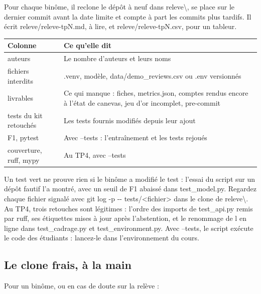 \documentclass[11pt,a4paper]{article}
\newcommand{\co}[1]{{\ttfamily\hyphenchar\font=45\relax #1}}
\newcommand{\bs}{\textbackslash\allowbreak{}}
\begin{document}
Pour chaque binôme, il reclone le dépôt à neuf dans \co{releve\bs}, se place sur le dernier commit avant la
date limite et compte à part les commits plus tardifs. Il écrit \co{releve/releve-tpN.md}, à lire, et
\co{releve/releve-tpN.csv}, pour un tableur.

\begin{center}
\begin{tabularx}{\textwidth}{@{}l X@{}}
\toprule
\textbf{Colonne} & \textbf{Ce qu'elle dit} \\
\midrule
\co{auteurs} & Le nombre d'auteurs et leurs noms \\
\co{fichiers interdits} & \co{.venv}, modèle, \co{data/demo\_reviews.csv} ou \co{.env} versionnés \\
\co{livrables} & Ce qui manque : fiches, \co{metrics.json}, comptes rendus encore à l'état de canevas, jeu d'or
incomplet, pre-commit \\
\co{tests du kit retouchés} & Les tests fournis modifiés depuis leur ajout \\
\co{F1}, \co{pytest} & Avec \co{--tests} : l'entraînement et les tests rejoués \\
\co{couverture}, \co{ruff}, \co{mypy} & Au TP4, avec \co{--tests} \\
\bottomrule
\end{tabularx}
\end{center}

\begin{enseignant}
Un test vert ne prouve rien si le binôme a modifié le test : l'essai du script sur un dépôt fautif l'a
montré, avec un seuil de F1 abaissé dans \co{test\_model.py}. Regardez chaque fichier signalé avec
\co{git log -p -{}- tests/<fichier>} dans le clone de \co{releve\bs}. Au TP4, trois retouches sont
légitimes : l'ordre des imports de \co{test\_api.py} remis par ruff, ses étiquettes mises à jour après
l'abstention, et le renommage de \co{l} en \co{ligne} dans \co{test\_cadrage.py} et
\co{test\_environment.py}. Avec \co{--tests}, le script exécute le code des étudiants : lancez-le dans
l'environnement du cours.
\end{enseignant}

\subsection{Le clone frais, à la main}

Pour un binôme, ou en cas de doute sur la relève :
\end{document}
